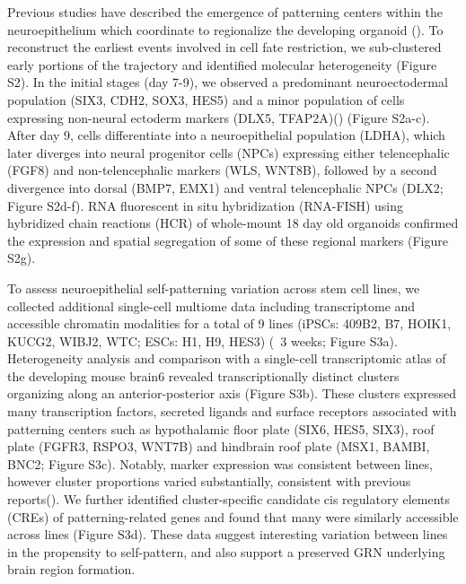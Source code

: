 Previous studies have described the emergence of patterning centers within the neuroepithelium which coordinate to regionalize the developing organoid (\cite{renner_self-organized_2017}). To reconstruct the earliest events involved in cell fate restriction, we sub-clustered early portions of the trajectory and identified molecular heterogeneity (Figure S2). In the initial stages (day 7-9), we observed a predominant neuroectodermal population (SIX3, CDH2, SOX3, HES5) and a minor population of cells expressing non-neural ectoderm markers (DLX5, TFAP2A)(\cite{mittnenzweig_single-embryo_2021,ealy_single-cell_2016}) (Figure S2a-c). After day 9, cells differentiate into a neuroepithelial population (LDHA), which later diverges into neural progenitor cells (NPCs) expressing either telencephalic (FGF8) and non-telencephalic markers (WLS, WNT8B), followed by a second divergence into dorsal (BMP7, EMX1) and ventral telencephalic NPCs (DLX2; Figure S2d-f). RNA fluorescent in situ hybridization (RNA-FISH) using hybridized chain reactions (HCR) of whole-mount 18 day old organoids confirmed the expression and spatial segregation of some of these regional markers (Figure S2g).

To assess neuroepithelial self-patterning variation across stem cell lines, we collected additional single-cell multiome data including transcriptome and accessible chromatin modalities for a total of 9 lines (iPSCs: 409B2, B7, HOIK1, KUCG2, WIBJ2, WTC; ESCs: H1, H9, HES3) (~3 weeks; Figure S3a). Heterogeneity analysis and comparison with a single-cell transcriptomic atlas of the developing mouse brain6 revealed transcriptionally distinct clusters organizing along an anterior-posterior axis (Figure S3b). These clusters expressed many transcription factors, secreted ligands and surface receptors associated with patterning centers such as hypothalamic floor plate (SIX6, HES5, SIX3), roof plate (FGFR3, RSPO3, WNT7B) and hindbrain roof plate (MSX1, BAMBI, BNC2; Figure S3c). Notably, marker expression was consistent between lines, however cluster proportions varied substantially, consistent with previous reports(\cite{kanton_organoid_2019}). We further identified cluster-specific candidate cis regulatory elements (CREs) of patterning-related genes and found that many were similarly accessible across lines (Figure S3d). These data suggest interesting variation between lines in the propensity to self-pattern, and also support a preserved GRN underlying brain region formation.


